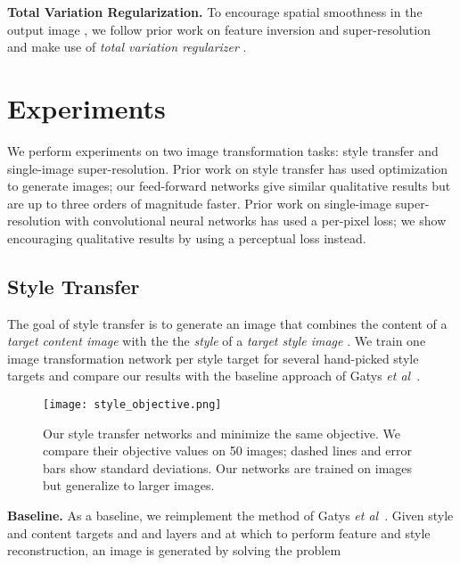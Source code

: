 \documentclass[runningheads]{llncs}
\newcommand{\etal}{\textit{et al}}
\begin{document}
\vspace{1mm}
\noindent\textbf{Total Variation Regularization.}
To encourage spatial smoothness in the output image , we
follow prior work on feature inversion \cite{mahendran15understanding,d2012beyond}
and super-resolution~\cite{aly2005image,zhang2010non} and make use of
\emph{total variation regularizer} .


\section{Experiments}
We perform experiments on two image transformation tasks: style transfer and single-image
super-resolution. Prior work on style transfer has used optimization to generate images;
our feed-forward networks give similar qualitative results but are up to three orders of
magnitude faster. Prior work on single-image super-resolution with convolutional neural
networks has used a per-pixel loss; we show encouraging qualitative results by using
a perceptual loss instead.

\subsection{Style Transfer}
\label{sec:style}
The goal of style transfer is to generate an image  that combines the content of
a \emph{target content image}  with the the \emph{style} of a \emph{target style image}
. We train one image transformation network per style target for several hand-picked
style targets and compare our results with the baseline approach of
Gatys \etal~\cite{gatys2015neural}.

\begin{figure}[t]
  \centering
  \texttt{[image: style\_objective.png]}
  \vspace{-4mm}
  \caption{Our style transfer networks and \cite{gatys2015neural} minimize the same objective.
    We compare their objective values on 50 images; dashed lines and error bars show standard
    deviations. Our networks are trained on  images but generalize to larger images.
  }
  \label{fig:style-loss}
  \vspace{-6mm}
\end{figure}

\vspace{1mm}
\noindent \textbf{Baseline.}
As a baseline, we reimplement the method of Gatys \etal~\cite{gatys2015neural}. Given style
and content targets  and  and layers  and  at which to perform feature and
style reconstruction, an image  is generated by solving the problem
\end{document}
